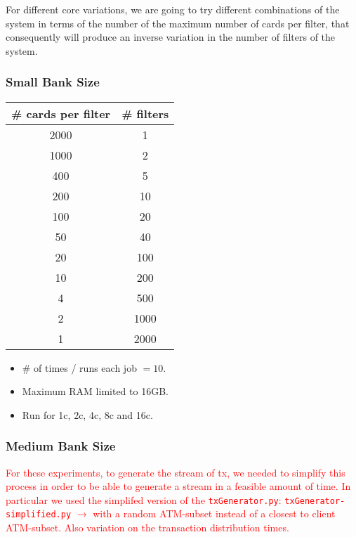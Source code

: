 \documentclass[12pt,a4paper]{article}
\begin{document}
    
For different core variations, we are going to try different combinations of the system in terms
of the number of the maximum number of cards per filter, that consequently will produce an inverse variation in the number of filters of the system.

\subsubsection{Small Bank Size}
    
\begin{table}[H]
    \renewcommand{\arraystretch}{1.5} %
    \centering
    \begin{tabular}{|c|c|}
    \hline
    \# cards per filter & \# filters \\ \hline
    2000   &   1     \\ \hline
    1000   &   2     \\ \hline
    400 &   5     \\ \hline
    200  &   10     \\ \hline
    100 &   20    \\ \hline
    50  &   40    \\ \hline
    20  &   100    \\ \hline
    10  &   200    \\ \hline
    4  &   500    \\ \hline
    2  &   1000    \\ \hline
    1  &   2000    \\ \hline
    \end{tabular}
\end{table}
    
\begin{itemize}
    \item \# of times / runs each job $=10$.
    \item Maximum RAM limited to 16GB.
    \item Run for 1c, 2c, 4c, 8c and 16c.
\end{itemize}
  
\subsubsection{Medium Bank Size}
  
\textcolor{red}{For these experiments, to generate the stream of tx, we needed to simplify this process in order to be able to generate a stream in a feasible amount of time. In particular we used the simplifed version of the \texttt{txGenerator.py}: \texttt{txGenerator-simplified.py} $\rightarrow$ with a random ATM-subset instead of a closest to client ATM-subset. Also variation on the transaction distribution times.}
  
\end{document}
